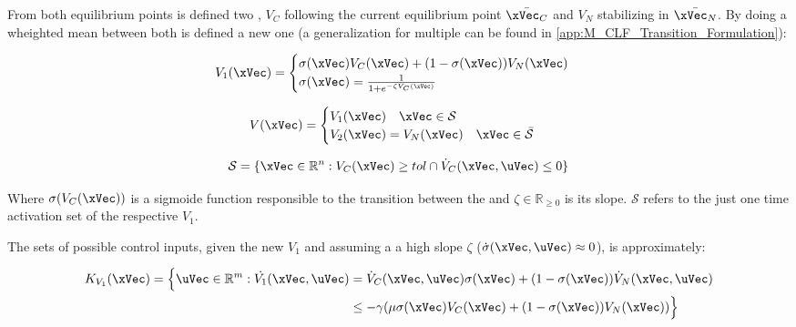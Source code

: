 From both equilibrium points is defined two , \(V_C\) following the current equilibrium point \(\bar{\xVec_C}\) and \(V_N\) stabilizing in \(\bar{\xVec_N}\). By doing a wheighted mean between both  is defined a new one (a generalization for multiple  can be found in \ref{app:M_CLF_Transition_Formulation}):

\begin{align}
    V_1(\xVec) = 
    \begin{cases}
        \sigma(\xVec) V_{C}(\xVec) + (1 - \sigma(\xVec))V_{N}(\xVec) \\
        \sigma(\xVec) = \frac{1}{1+e^{-\zeta V_{C}(\xVec)}} 
    \end{cases}
    \label{eq:1stPhase_2-CLF-S}
\end{align}

\begin{align}
    V(\xVec) = 
    \begin{cases}
        V_1(\xVec) \quad \xVec \in \mathcal{S}\\
        V_2(\xVec) = V_{N}(\xVec) \quad \xVec \in \bar{\mathcal{S}}
    \end{cases}
    \label{eq:New_2-CLF-S}
\end{align}

\begin{equation}
    \mathcal{S} = \{\xVec \in \mathbb{R}^n: V_{C}(\xVec) \geq tol \cap \dot{V}_{C}(\xVec, \uVec) \leq 0 \}
    \label{eq:New_2-CLF-S_actuationPhaseSet}
\end{equation}

Where \(\sigma(V_C(\xVec))\) is a sigmoide function responsible to the transition between the  and \(\zeta \in \mathbb{R}_{\geq 0}\) is its slope. \(\mathcal{S}\) refers to the just one time activation set of the respective  \(V_1\). 



The sets of possible control inputs, given the new  \(V_1\) and assuming a a high slope \(\zeta\) (\(\dot{\sigma}(\xVec, \uVec)\approx 0\)), is approximately:

\begin{align}
    K_{V_1}(\xVec) = \Bigl\{\uVec \in \mathbb{R}^m: \dot{V_1}(\xVec, \uVec) &= \dot{V}_{C}(\xVec, \uVec) \sigma(\xVec) + (1-\sigma(\xVec))\dot{V}_{N}(\xVec, \uVec) \notag \\
    &\leq -\gamma( \mu \sigma(\xVec) V_{C}(\xVec) + (1 - \sigma(\xVec))V_{N}(\xVec)  )\Bigr\}
    \label{eq:2-CLF-S_Constraint}
\end{align}


